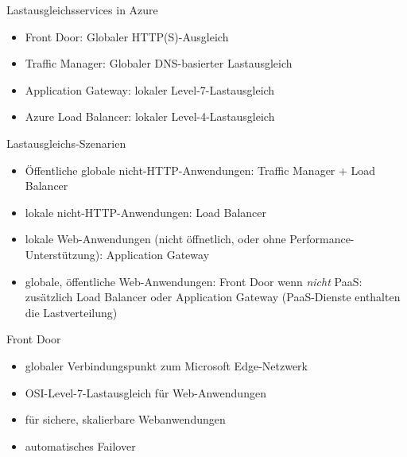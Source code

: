 \begin{flashcard}[]{Lastausgleichsservices in Azure}
  \begin{itemize}
    \item Front Door: Globaler HTTP(S)-Ausgleich
    \item Traffic Manager: Globaler DNS-basierter Lastausgleich
    \item Application Gateway: lokaler Level-7-Lastausgleich
    \item Azure Load Balancer: lokaler Level-4-Lastausgleich
  \end{itemize}
\end{flashcard}

\begin{flashcard}[]{Lastausgleichs-Szenarien}
  \begin{itemize}
    \item Öffentliche globale nicht-HTTP-Anwendungen: Traffic Manager + Load Balancer
    \item lokale nicht-HTTP-Anwendungen: Load Balancer
    \item lokale Web-Anwendungen (nicht öffnetlich, oder ohne Performance-Unterstützung): Application Gateway
    \item globale, öffentliche Web-Anwendungen: Front Door\newline
      wenn \emph{nicht} PaaS: zusätzlich Load Balancer oder Application Gateway\newline
      (PaaS-Dienste enthalten die Lastverteilung)
  \end{itemize}
\end{flashcard}

\begin{flashcard}[]{Front Door}
  \begin{itemize}
    \item globaler Verbindungspunkt zum Microsoft Edge-Netzwerk
    \item OSI-Level-7-Lastausgleich für Web-Anwendungen
    \item für sichere, skalierbare Webanwendungen
    \item automatisches Failover
  \end{itemize}
\end{flashcard}

